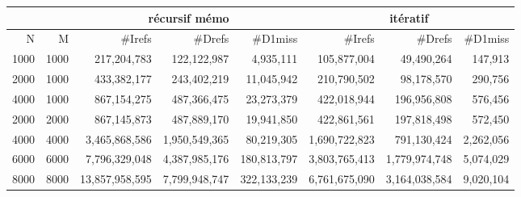 \documentclass[10pt,a4paper]{article}
\begin{document}
\begin{center}
{\footnotesize
\begin{tabular}{|r|r||r|r|r||r|r|r||}
\hline
 \multicolumn{2}{|c||}{ } 
& \multicolumn{3}{c||}{récursif mémo}
& \multicolumn{3}{c||}{itératif}

\\ \hline
N & M 
& \#Irefs & \#Drefs & \#D1miss %
& \#Irefs & \#Drefs & \#D1miss %
\\ \hline
\hline
1000 & 1000 
& 217,204,783 & 122,122,987 & 4,935,111%
& 105,877,004 & 49,490,264 & 147,913   %
\\ \hline
2000 & 1000 
& 433,382,177 & 243,402,219 & 11,045,942  %
& 210,790,502 & 98,178,570 & 290,756  %
\\ \hline
4000 & 1000 
& 867,154,275 & 487,366,475 & 23,273,379  %
& 422,018,944 & 196,956,808 &  576,456 %
\\ \hline
2000 & 2000 
&  867,145,873 & 487,889,170& 19,941,850%
& 422,861,561& 197,818,498& 572,450 %
\\ \hline
4000 & 4000 
&3,465,868,586 & 1,950,549,365& 80,219,305 %
& 1,690,722,823& 791,130,424& 2,262,056 %
\\ \hline
6000 & 6000 
& 7,796,329,048&4,387,985,176 & 180,813,797 %
& 3,803,765,413&1,779,974,748 & 5,074,029 %
\\ \hline
8000 & 8000 
& 13,857,958,595& 7,799,948,747& 322,133,239 %
& 6,761,675,090& 3,164,038,584& 9,020,104 %
\\ \hline
\hline
\end{tabular}
}

\vspace{0.5cm}


\end{center}
\end{document}
